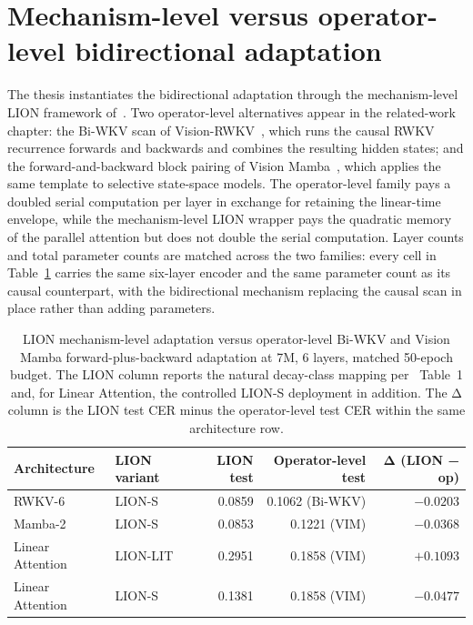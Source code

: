 \section{Mechanism-level versus operator-level bidirectional adaptation}\label{app:diagnostics:lion-vs-vim}

The thesis instantiates the bidirectional adaptation through the
mechanism-level LION framework of~\citet{afzal2025linear}. Two
operator-level alternatives appear in the related-work chapter:
the Bi-WKV scan of Vision-RWKV~\cite{duan2024visionrwkv}, which
runs the causal RWKV recurrence forwards and backwards and combines
the resulting hidden states; and the forward-and-backward block
pairing of Vision Mamba~\cite{zhu2024visionmamba}, which applies
the same template to selective state-space models. The
operator-level family pays a doubled serial computation per layer
in exchange for retaining the linear-time envelope, while the
mechanism-level LION wrapper pays the quadratic memory of the
parallel attention but does not double the serial computation.
Layer counts and total parameter counts are matched across the
two families: every cell in
Table~\ref{tab:results:bidirectional-comparison-7m} carries the
same six-layer encoder and the same parameter count as its causal
counterpart, with the bidirectional mechanism replacing the causal
scan in place rather than adding parameters.

\begin{table}[!htbp]
\centering
\small
\caption[LION versus operator-level bidirectional comparison, 7M]{LION
mechanism-level adaptation versus operator-level Bi-WKV and Vision
Mamba forward-plus-backward adaptation at 7M, 6 layers, matched
50-epoch budget. The LION column reports the natural decay-class
mapping per~\citet{afzal2025linear} Table~1 and, for Linear
Attention, the controlled LION-S deployment in addition. The Δ
column is the LION test CER minus the operator-level test CER
within the same architecture row.}
\label{tab:results:bidirectional-comparison-7m}
\setlength{\tabcolsep}{6pt}
\renewcommand{\arraystretch}{1.15}
\begin{tabularx}{\linewidth}{@{}p{2.6cm} X r r r@{}}
\toprule
\textbf{Architecture} & \textbf{LION variant} &
\textbf{LION test} & \textbf{Operator-level test} &
\textbf{Δ (LION − op)} \\
\midrule
RWKV-6           & LION-S    & 0.0859 & 0.1062 (Bi-WKV) & $-0.0203$ \\
Mamba-2          & LION-S    & 0.0853 & 0.1221 (VIM)    & $-0.0368$ \\
Linear Attention & LION-LIT  & 0.2951 & 0.1858 (VIM)    & $+0.1093$ \\
Linear Attention & LION-S    & 0.1381 & 0.1858 (VIM)    & $-0.0477$ \\
\bottomrule
\end{tabularx}
\end{table}

